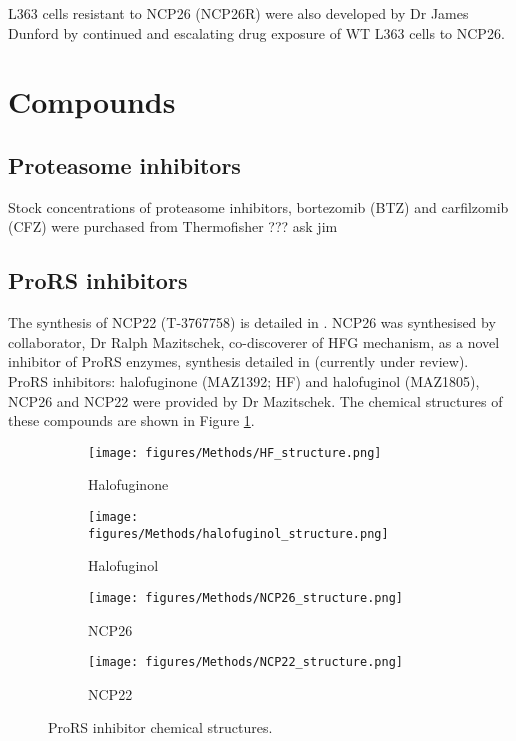 L363 cells resistant to NCP26 (NCP26R) were also developed by Dr James Dunford by continued and escalating drug exposure of WT L363 cells to NCP26.

\section{Compounds}

\subsection{Proteasome inhibitors}
Stock concentrations of proteasome inhibitors, bortezomib (BTZ) and carfilzomib (CFZ) were purchased from Thermofisher ??? ask jim

\subsection{ProRS inhibitors}
The synthesis of NCP22 (T-3767758) is detailed in \cite{adachi2017discovery}.
NCP26 was synthesised by collaborator,  Dr Ralph Mazitschek, co-discoverer of HFG mechanism, as a novel inhibitor of ProRS enzymes, synthesis detailed in \cite{tyediscovery2021} (currently under review).
ProRS inhibitors: halofuginone (MAZ1392; HF) and halofuginol (MAZ1805), NCP26 and NCP22 were provided by Dr Mazitschek.
The chemical structures of these compounds are shown in Figure \ref{fig:chem_structures}.

\begin{figure}[ht]
\centering
\begin{subfigure}{0.49\textwidth}
    \texttt{[image: figures/Methods/HF\_structure.png]}
    \caption{Halofuginone}
\end{subfigure}
\begin{subfigure}{0.49\textwidth}
    \texttt{[image: figures/Methods/halofuginol\_structure.png]}
    \caption{Halofuginol}
\end{subfigure}
%
\medskip
\begin{subfigure}{0.45\textwidth}
    \texttt{[image: figures/Methods/NCP26\_structure.png]}
    \caption{NCP26}
\end{subfigure}
\begin{subfigure}{0.45\textwidth}
    \texttt{[image: figures/Methods/NCP22\_structure.png]}
    \caption{NCP22}
\end{subfigure}
\caption[ProRS inhibitor chemical structures]{ProRS inhibitor chemical structures.
}
\label{fig:chem_structures}
\end{figure}

